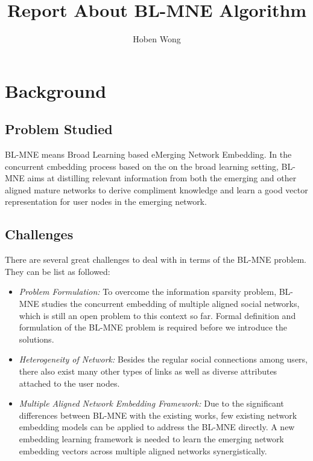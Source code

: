\documentclass{article}
\author {Hoben Wong}
\title {Report About BL-MNE Algorithm}
\begin{document}
\maketitle
\section{Background}
\subsection{Problem Studied}
 BL-MNE means Broad Learning based eMerging Network Embedding. In the concurrent cmbedding process based on the on the broad learning setting, BL-MNE aims
at distilling relevant information from both the emerging and other
aligned mature networks to derive compliment knowledge and learn
a good vector representation for user nodes in the emerging network.

\subsection{Challenges}
There are several great challenges to deal with in terms of the BL-MNE problem. They can be list as followed:
\begin{itemize}
  \item \emph{Problem Formulation:} To overcome the information sparsity problem, BL-MNE studies the concurrent embedding of multiple aligned social networks, which is still an open problem to this context so far. Formal definition and formulation of the BL-MNE problem is required before we introduce the solutions.
  \item \emph{Heterogeneity of Network:} Besides the regular social
connections among users, there also exist many other types of
links as well as diverse attributes attached to the user nodes.
  \item \emph{Multiple Aligned Network Embedding Framework:}  Due to the significant differences between BL-MNE with the existing works, few existing network embedding models can be applied
to address the BL-MNE directly. A new embedding learning framework is needed to learn the emerging network embedding vectors across multiple aligned networks synergistically.

\end{itemize}
\end{document}
